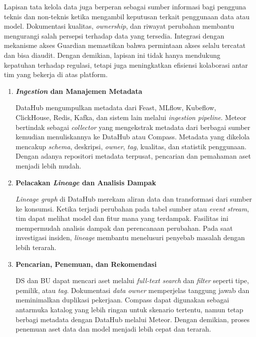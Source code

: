 Lapisan tata kelola data juga berperan sebagai sumber informasi bagi pengguna teknis dan non-teknis ketika mengambil keputusan terkait penggunaan data atau model. Dokumentasi kualitas, \textit{ownership}, dan riwayat perubahan membantu mengurangi salah persepsi terhadap data yang tersedia. Integrasi dengan mekanisme akses Guardian memastikan bahwa permintaan akses selalu tercatat dan bisa diaudit. Dengan demikian, lapisan ini tidak hanya mendukung kepatuhan terhadap regulasi, tetapi juga meningkatkan efisiensi kolaborasi antar tim yang bekerja di atas platform.

\vspace{0.5em}
\begin{enumerate}
    \item \textbf{\textit{Ingestion} dan Manajemen Metadata}  

    DataHub mengumpulkan metadata dari Feast, MLflow, Kubeflow, ClickHouse, Redis, Kafka, dan sistem lain melalui \textit{ingestion pipeline}. Meteor bertindak sebagai \textit{collector} yang mengekstrak metadata dari berbagai sumber kemudian menuliskannya ke DataHub atau Compass. Metadata yang dikelola mencakup \textit{schema}, deskripsi, \textit{owner}, \textit{tag}, kualitas, dan statistik penggunaan. Dengan adanya repositori metadata terpusat, pencarian dan pemahaman aset menjadi lebih mudah.

    \vspace{0.5em}

    \item \textbf{Pelacakan \textit{Lineage} dan Analisis Dampak}  

    \textit{Lineage graph} di DataHub merekam aliran data dan transformasi dari sumber ke konsumsi. Ketika terjadi perubahan pada tabel sumber atau \textit{event stream}, tim dapat melihat model dan fitur mana yang terdampak. Fasilitas ini mempermudah analisis dampak dan perencanaan perubahan. Pada saat investigasi insiden, \textit{lineage} membantu menelusuri penyebab masalah dengan lebih terarah.

    \vspace{0.5em}

    \item \textbf{Pencarian, Penemuan, dan Rekomendasi}  

    DS dan BU dapat mencari aset melalui \textit{full-text search} dan \textit{filter} seperti tipe, pemilik, atau \textit{tag}. Dokumentasi \textit{data owner} memperjelas tanggung jawab dan meminimalkan duplikasi pekerjaan. Compass dapat digunakan sebagai antarmuka katalog yang lebih ringan untuk skenario tertentu, namun tetap berbagi metadata dengan DataHub melalui Meteor. Dengan demikian, proses penemuan aset data dan model menjadi lebih cepat dan terarah.


\end{enumerate}

